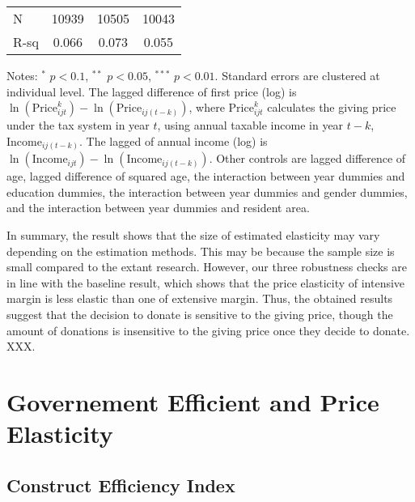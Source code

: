 \documentclass[
]{article}
\begin{document}
\begin{table}
\begin{threeparttable}
\begin{tabular}[t]{lccc}
\hspace{1em}N & 10939 & 10505 & 10043\\
\hspace{1em}R-sq & 0.066 & 0.073 & 0.055\\
\bottomrule
\end{tabular}
\begin{tablenotes}
\item Notes: $^{*}$ $p < 0.1$, $^{**}$ $p < 0.05$, $^{***}$ $p < 0.01$. Standard errors are clustered at individual level. The lagged difference of first price (log) is $\ln(\text{Price}^k_{ijt}) - \ln(\text{Price}_{ij(t-k)})$, where $\text{Price}^k_{ijt}$ calculates the giving price under the tax system in year $t$, using annual taxable income in year $t-k$, $\text{Income}_{ij(t-k)}$. The lagged of annual income (log) is $\ln(\text{Income}_{ijt}) - \ln(\text{Income}_{ij(t-k)})$. Other controls are lagged difference of age, lagged difference of squared age, the interaction between year dummies and education dummies, the interaction between year dummies and gender dummies, and the interaction between year dummies and resident area.
\end{tablenotes}
\end{threeparttable}
\end{table}

In summary, the result shows that the size of estimated elasticity may vary depending on the estimation methods. This may be because the sample size is small compared to the extant research. However, our three robustness checks are in line with the baseline result, which shows that the price elasticity of intensive margin is less elastic than one of extensive margin. Thus, the obtained results suggest that the decision to donate is sensitive to the giving price, though the amount of donations is insensitive to the giving price once they decide to donate.
\color{blue}XXX\color{black}.

\hypertarget{governement-efficient-and-price-elasticity}{%
\section{Governement Efficient and Price Elasticity}\label{governement-efficient-and-price-elasticity}}

\hypertarget{construct-efficiency-index}{%
\subsection{Construct Efficiency Index}\label{construct-efficiency-index}}
\end{document}
